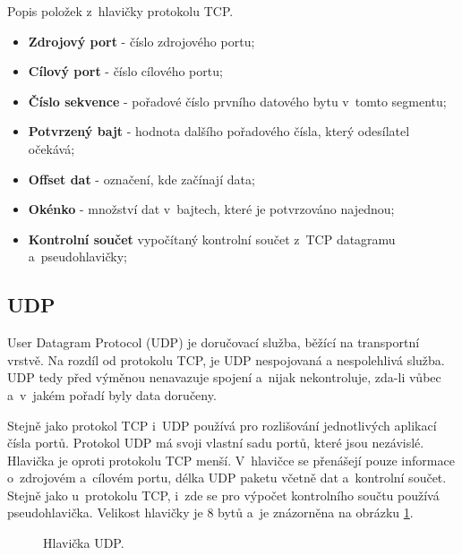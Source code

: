 Popis položek z~hlavičky protokolu TCP.

\begin{itemize}
    \item \textbf{Zdrojový port} - číslo zdrojového portu;
    \item \textbf{Cílový port} - číslo cílového portu;
    \item \textbf{Číslo sekvence} - pořadové číslo prvního datového bytu v~tomto segmentu;
    \item \textbf{Potvrzený bajt} - hodnota dalšího pořadového čísla, který odesílatel očekává;
    \item \textbf{Offset dat} - označení, kde začínají data;
    \item \textbf{Okénko} - množství dat v~bajtech, které je potvrzováno najednou;
    \item \textbf{Kontrolní součet} vypočítaný kontrolní součet z~TCP datagramu a~pseudohlavičky;
\end{itemize}

\subsection{UDP}
 User Datagram Protocol (UDP) \cite{udp} je doručovací služba, běžící na transportní vrstvě. Na rozdíl od protokolu TCP, je UDP nespojovaná a nespolehlivá služba. UDP tedy před výměnou nenavazuje spojení a~nijak nekontroluje, zda-li vůbec a~v~jakém pořadí byly data doručeny.

Stejně jako protokol TCP i~UDP používá pro rozlišování jednotlivých aplikací čísla portů. Protokol UDP má svoji vlastní sadu portů, které jsou nezávislé. Hlavička je oproti protokolu TCP menší. V~hlavičce se přenášejí pouze informace o~zdrojovém a~cílovém portu, délka UDP paketu včetně dat a~kontrolní součet. Stejně jako u~protokolu TCP, i~zde se pro výpočet kontrolního součtu používá pseudohlavička. Velikost hlavičky je 8 bytů a~je znázorněna na obrázku \ref{img:hlavika_udp}. 

\begin{figure}[H]
    \centering
    \caption{Hlavička UDP.}
    \label{img:hlavika_udp}
\end{figure}

